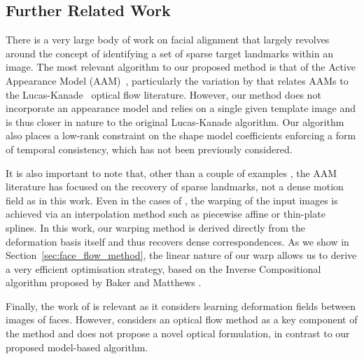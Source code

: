 \subsection{Further Related Work}\label{subsec:face_flow_further_related_work}
There is a very large body of work on facial alignment that largely revolves
around the concept of identifying a set of sparse target landmarks within an
image. The most relevant algorithm to our proposed method is that of the
Active Appearance Model (AAM)~\cite{cootes2001active}, particularly the variation by
\citet{matthews2004active} that relates AAMs to the 
Lucas-Kanade~\cite{lucas1981iterative,baker2004lucas} optical flow literature. 
However, our method does not incorporate an appearance model and relies on a single given template
image and is thus closer in nature to the original Lucas-Kanade algorithm. 
Our algorithm also places a low-rank constraint on the shape model coefficients
enforcing a form of temporal consistency, which has not been previously 
considered.

It is also important to note that, other than a couple of examples
\cite{ramnath2008increasing,anderson2014using}, the AAM literature has focused on the
recovery of sparse landmarks, not a dense motion field as in this work.
Even in the cases of \citet{ramnath2008increasing,anderson2014using}, the warping of the
input images is achieved via an interpolation method such as
piecewise affine or thin-plate splines. In this work, our warping
method is derived directly from the deformation basis itself and thus recovers
dense correspondences.
As we show in Section~\ref{sec:face_flow_method}, the linear nature of our warp allows
us to derive a very efficient optimisation strategy,
based on the Inverse Compositional algorithm proposed by Baker and Matthews
\cite{baker2004lucas}. 

Finally, the work of \citet{kemelmacher2012collection}
is relevant as it considers learning deformation fields between images of faces.
However, \citet{kemelmacher2012collection} considers an optical flow method
as a key component of the method and does not propose a novel optical formulation,
in contrast to our proposed model-based algorithm.
